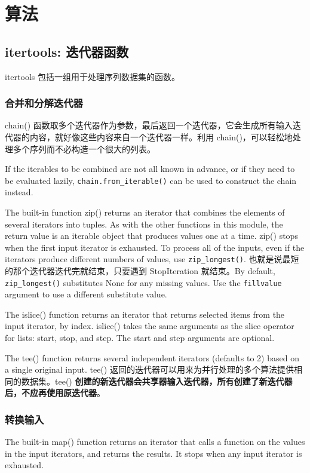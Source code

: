 \chapter{算法}
\section{itertools: 迭代器函数}
itertools 包括一组用于处理序列数据集的函数。
\subsection{合并和分解迭代器}
chain() 函数取多个迭代器作为参数，最后返回一个迭代器，它会生成所有输入迭代器的内容，就好像这些内容来自一个迭代器一样。利用 chain()，可以轻松地处理多个序列而不必构造一个很大的列表。

If the iterables to be combined are not all known in advance, or if they need to be evaluated lazily, \verb|chain.from_iterable()| can be used to construct the chain instead.

The built-in function zip() returns an iterator that combines the elements of several iterators into tuples. As with the other functions in this module, the return value is an iterable object that produces values one at a time. zip() stops when the first input iterator is exhausted. To process all of the inputs, even if the iterators produce different numbers of values, use \verb|zip_longest()|. 也就是说最短的那个迭代器迭代完就结束，只要遇到 StopIteration 就结束。By default, \verb|zip_longest()| substitutes None for any missing values. Use the \verb|fillvalue| argument to use a different substitute value.

The islice() function returns an iterator that returns selected items from the input iterator, by index. islice() takes the same arguments as the slice operator for lists: start, stop, and step. The start and step arguments are optional.

The tee() function returns several independent iterators (defaults to 2) based on a single original input. tee() 返回的迭代器可以用来为并行处理的多个算法提供相同的数据集。tee() \textbf{创建的新迭代器会共享器输入迭代器，所有创建了新迭代器后，不应再使用原迭代器}。

\subsection{转换输入}
The built-in map() function returns an iterator that calls a function on the values in the input iterators, and returns the results. It stops when any input iterator is exhausted.

